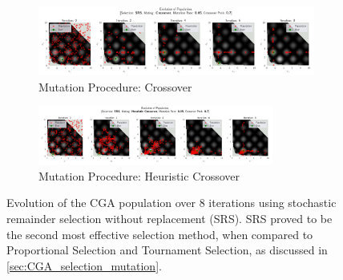 \documentclass[10pt]{article}
\begin{document}
\begin{figure}[H]
    \centering
    \begin{subfigure}{0.85\textwidth}
        \centering
        \includegraphics[width=\textwidth]{../figures/KBF/10_iters/SRS/Crossover/0.05_0.7_Population.png}
        \caption{Mutation Procedure: Crossover}
        \label{fig:CGA_flowchart_SRS_crossover}
    \end{subfigure}
    \begin{subfigure}{\textwidth}
        \centering
        \includegraphics[width=0.85\textwidth]{../figures/KBF/10_iters/SRS/Heuristic Crossover/0.05_0.7_Population.png}
        \caption{Mutation Procedure: Heuristic Crossover}
        \label{fig:CGA_flowchart_SRS_Heuristic Crossover}
    \end{subfigure}
    \captionsetup{justification=centering}
    \caption{Evolution of the CGA population over 8 iterations using stochastic remainder selection without replacement (SRS). SRS proved to be the second most effective selection method, when compared to Proportional Selection and Tournament Selection, as discussed in \ref{sec:CGA_selection_mutation}.}
    \label{fig:CGA_flowchart_SRS}
\end{figure}
\end{document}
